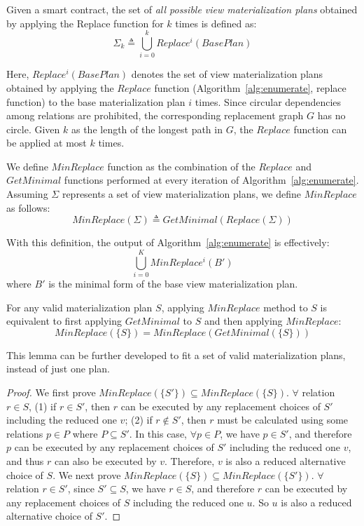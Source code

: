 \begin{deff}
Given a smart contract, the set of {\em all possible view materialization plans} obtained by applying the Replace function for $k$ times is defined as:
       \[ \Sigma_k \triangleq \bigcup_{i=0}^{k} Replace^i(BasePlan) \] 
\end{deff}

Here, $Replace^i(BasePlan)$ denotes the set of view materialization plans obtained by applying the $Replace$ function (Algorithm~\ref{alg:enumerate}, {\sf replace} function) to the base materialization plan $i$ times. Since circular dependencies among relations are prohibited, the corresponding replacement graph $G$ has no circle. Given $k$ as the length of the longest path in $G$, the $Replace$ function can be applied at most $k$ times.

\begin{deff}\label{def:min-replace}
We define $MinReplace$ function as the combination of the $Replace$ and $GetMinimal$ functions performed at every iteration of Algorithm~\ref{alg:enumerate}. Assuming $\Sigma$ represents a set of view materialization plans, we define $MinReplace$ as follows:
        \[ MinReplace(\Sigma) \triangleq GetMinimal(Replace(\Sigma))  \]
\end{deff}
        
With this definition, the output of Algorithm~\ref{alg:enumerate} is effectively:
\[  \bigcup_{i=0}^{K}MinReplace^i(B') \]
where $B'$ is the minimal form of the base view materialization plan.

\begin{lmm}\label{lmm:getmini}
For any valid materialization plan $S$, 
applying $MinReplace$ method to $S$ is equivalent to first applying $GetMinimal$ to $S$ and then applying $MinReplace$:
\[
    MinReplace(\{S\}) = MinReplace(GetMinimal(\{S\}))
\]
\end{lmm}

This lemma can be further developed to fit a set of valid materialization plans,
instead of just one plan.

\begin{proof}
We first prove $MinReplace(\{S'\}) \subseteq MinReplace(\{S\})$. $\forall$ relation $r \in S$, (1) if $r \in S'$, then $r$ can be executed by any replacement choices of $S'$ including the reduced one $v$; (2) if $r \notin S'$, then $r$ must be calculated using some relations $p \in P$ where $P \subseteq S'$. In this case, $\forall p \in P$, we have $p \in S'$, and therefore $p$ can be executed by any replacement choices of $S'$ including the reduced one $v$, and thus $r$ can also be executed by $v$. Therefore, $v$ is also a reduced alternative choice of $S$. 
We next prove $MinReplace(\{S\}) \subseteq MinReplace(\{S'\})$.
$\forall$ relation $r \in S'$, since $S' \subseteq S$, we have $r \in S$, and therefore $r$ can be executed by any replacement choices of $S$ including the reduced one $u$. So $u$ is also a reduced alternative choice of $S'$.
\end{proof}

